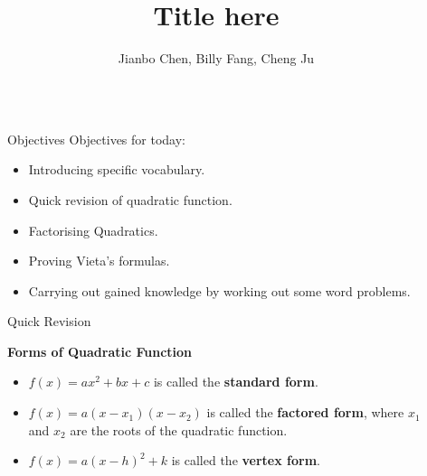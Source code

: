 \documentclass[final]{beamer}
\title{Title here} %
\author{Jianbo Chen, Billy Fang, Cheng Ju} %
\institute{CS 294-129, Fall 2016} %
\newlength{\sepwid}
\newlength{\onecolwid}
\begin{document}

\setlength{\belowcaptionskip}{2ex} %
\setlength\belowdisplayshortskip{2ex} %

\begin{frame}[t] %

\begin{columns}[t] %

\begin{column}{\sepwid}\end{column} %

\begin{column}{\onecolwid} %


\begin{alertblock}{Objectives}
Objectives for today:
\begin{itemize}
\item Introducing specific vocabulary.
\item Quick revision of quadratic function.
\item Factorising Quadratics.
\item Proving Vieta's formulas.
\item Carrying out gained knowledge by working out some word problems.
\end{itemize}

\end{alertblock}


\begin{block}{Quick Revision}

\textbf{Forms of Quadratic Function}
\begin{itemize}
\item $f(x) = ax^2+bx+c$ is called the \textbf{standard form}.
\item $f(x) = a(x-x_1)(x-x_2)$ is called the \textbf{factored form}, where $x_1$ and $x_2$ are the roots of the quadratic function.
\item $f(x) = a(x-h)^2+k$ is called the \textbf{vertex form}.
\end{itemize}


\end{block}
\end{column}
\end{columns}
\end{frame}
\end{document}
